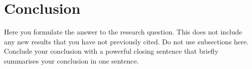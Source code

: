 \chapter{Conclusion}

Here you formulate the answer to the research question.
This does not include any new results that you have not previously cited. Do not use subsections here. 
Conclude your conclusion with a powerful closing sentence that briefly summarises your conclusion in one sentence.
